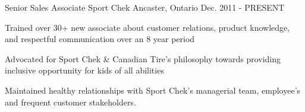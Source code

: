 

\begin{cventries}

  \cventry
    {Senior Sales Associate } %
    {Sport Chek} %
    {Ancaster, Ontario } %
    {Dec. 2011 - PRESENT} %
    {
      \begin{cvitems} %
        \item {Trained over 30+ new associate about customer relations, product knowledge, and respectful communication over an 8 year period}
        \item {Advocated for Sport Chek \& Canadian Tire's philosophy towards providing inclusive opportunity for kids of all abilities }
        \item {Maintained healthy relationships with Sport Chek's managerial team, employee's and frequent customer stakeholders.}
      \end{cvitems}
    }




\end{cventries}
